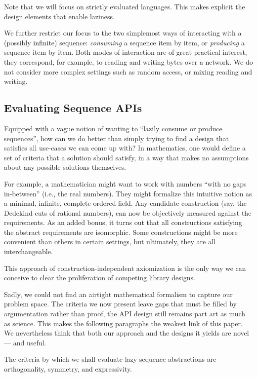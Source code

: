 \documentclass[sigplan,screen,10pt,anonymous,review]{acmart}
\begin{document}
Note that we will focus on strictly evaluated languages. This makes explicit the design elements that enable laziness.

We further restrict our focus to the two simplemost ways of interacting with a (possibly infinite) sequence: \textit{consuming} a sequence item by item, or \textit{producing} a sequence item by item. Both modes of interaction are of great practical interest, they correspond, for example, to reading and writing bytes over a network. We do not consider more complex settings such as random access, or mixing reading and writing.

\subsection{Evaluating Sequence APIs}

Equipped with a vague notion of wanting to ``lazily consume or produce sequences'', how can we do better than simply trying to find a design that satisfies all use-cases we can come up with? In mathematics, one would define a set of criteria that a solution should satisfy, in a way that makes no assumptions about any possible solutions themselves.

For example, a mathematician might want to work with numbers ``with no gaps in-between'' (i.e., the real numbers). They might formalize this intuitive notion as a minimal, infinite, complete ordered field. Any candidate construction (say, the Dedekind cuts of rational numbers), can now be objectively measured against the requirements. As an added bonus, it turns out that all constructions satisfying the abstract requirements are isomorphic. Some constructions might be more convenient than others in certain settings, but ultimately, they are all interchangeable.

This approach of construction-independent axiomization is the only way we can conceive to clear the proliferation of competing library designs.

Sadly, we could not find an airtight mathematical formalism to capture our problem space. The criteria we now present leave gaps that must be filled by argumentation rather than proof, the API design still remains part art as much as science. This makes the following paragraphs the weakest link of this paper. We nevertheless think that both our approach and the designs it yields are novel --- and useful.

The criteria by which we shall evaluate lazy sequence abstractions are orthogonality, symmetry, and expressivity.
\end{document}
